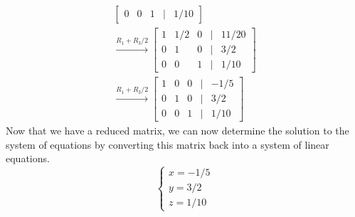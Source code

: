 \begin{example}
\begin{solution}
\begin{gather*}
\begin{bmatrix}
            0 & 0 & 1 & \vert & 1/10
        \end{bmatrix}\\
        \overset{R_1 + R_3/2}{\longrightarrow} \begin{bmatrix}
            1 & 1/2 & 0 & \vert & 11/20 \\
            0 & 1 & 0 & \vert & 3/2 \\
            0 & 0 & 1 & \vert & 1/10
        \end{bmatrix}\\
        \overset{R_1 + R_3/2}{\longrightarrow} \begin{bmatrix}
            1 & 0 & 0 & \vert & -1/5 \\
            0 & 1 & 0 & \vert & 3/2 \\
            0 & 0 & 1 & \vert & 1/10
        \end{bmatrix}
        \end{gather*}
        Now that we have a reduced matrix, we can now determine the solution to the system of equations by converting this matrix back into a system of linear equations.
        \[\begin{cases}
            x = -1/5 \\
            y = 3/2 \\
            z = 1/10
        \end{cases}\]
    \end{solution}
\end{example}

